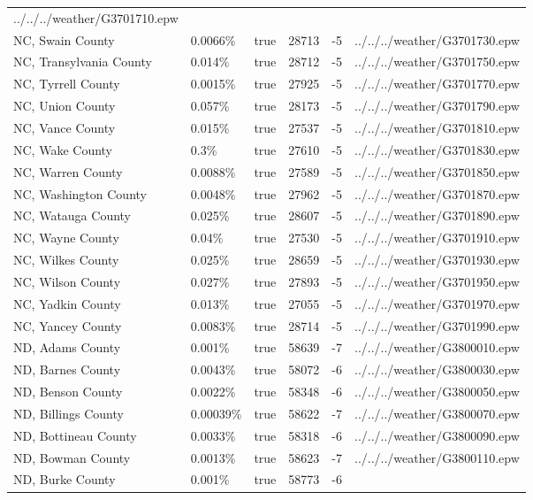 \begin{longtable}[]{@{}llllll@{}}
../../../weather/G3701710.epw \\
NC, Swain County & 0.0066\% & true & 28713 & -5 &
../../../weather/G3701730.epw \\
NC, Transylvania County & 0.014\% & true & 28712 & -5 &
../../../weather/G3701750.epw \\
NC, Tyrrell County & 0.0015\% & true & 27925 & -5 &
../../../weather/G3701770.epw \\
NC, Union County & 0.057\% & true & 28173 & -5 &
../../../weather/G3701790.epw \\
NC, Vance County & 0.015\% & true & 27537 & -5 &
../../../weather/G3701810.epw \\
NC, Wake County & 0.3\% & true & 27610 & -5 &
../../../weather/G3701830.epw \\
NC, Warren County & 0.0088\% & true & 27589 & -5 &
../../../weather/G3701850.epw \\
NC, Washington County & 0.0048\% & true & 27962 & -5 &
../../../weather/G3701870.epw \\
NC, Watauga County & 0.025\% & true & 28607 & -5 &
../../../weather/G3701890.epw \\
NC, Wayne County & 0.04\% & true & 27530 & -5 &
../../../weather/G3701910.epw \\
NC, Wilkes County & 0.025\% & true & 28659 & -5 &
../../../weather/G3701930.epw \\
NC, Wilson County & 0.027\% & true & 27893 & -5 &
../../../weather/G3701950.epw \\
NC, Yadkin County & 0.013\% & true & 27055 & -5 &
../../../weather/G3701970.epw \\
NC, Yancey County & 0.0083\% & true & 28714 & -5 &
../../../weather/G3701990.epw \\
ND, Adams County & 0.001\% & true & 58639 & -7 &
../../../weather/G3800010.epw \\
ND, Barnes County & 0.0043\% & true & 58072 & -6 &
../../../weather/G3800030.epw \\
ND, Benson County & 0.0022\% & true & 58348 & -6 &
../../../weather/G3800050.epw \\
ND, Billings County & 0.00039\% & true & 58622 & -7 &
../../../weather/G3800070.epw \\
ND, Bottineau County & 0.0033\% & true & 58318 & -6 &
../../../weather/G3800090.epw \\
ND, Bowman County & 0.0013\% & true & 58623 & -7 &
../../../weather/G3800110.epw \\
ND, Burke County & 0.001\% & true & 58773 & -6 &

\end{longtable}

